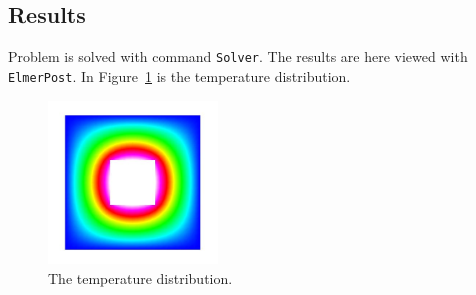 \subsection*{Results}
Problem is solved with command {\tt Solver}. The results are here viewed with
{\tt ElmerPost}. In Figure~\ref{f:temperature} is the temperature distribution.
\begin{figure}[!hb]
\begin{center}
\includegraphics[width=0.4\textwidth]{temperature}
\end{center}
\caption{The temperature distribution.}
\label{f:temperature}
\end{figure}



















